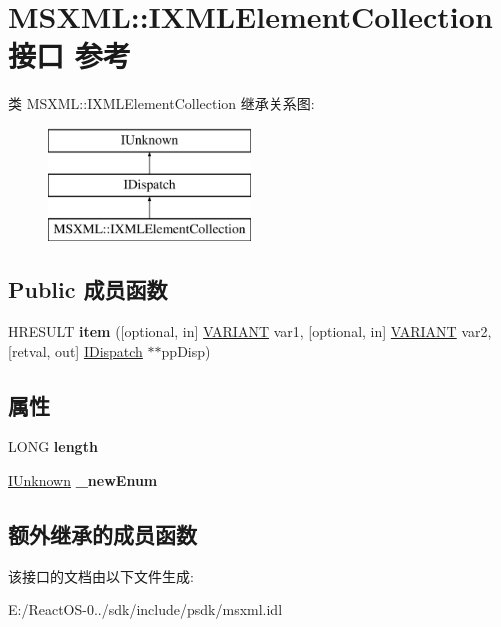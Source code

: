 \hypertarget{interface_m_s_x_m_l_1_1_i_x_m_l_element_collection}{}\section{M\+S\+X\+ML\+:\+:I\+X\+M\+L\+Element\+Collection接口 参考}
\label{interface_m_s_x_m_l_1_1_i_x_m_l_element_collection}
类 M\+S\+X\+ML\+:\+:I\+X\+M\+L\+Element\+Collection 继承关系图\+:\begin{figure}[H]
\begin{center}
\leavevmode
\includegraphics[height=3.000000cm]{interface_m_s_x_m_l_1_1_i_x_m_l_element_collection}
\end{center}
\end{figure}
\subsection*{Public 成员函数}
\begin{DoxyCompactItemize}
\item 
\mbox{\label{interface_m_s_x_m_l_1_1_i_x_m_l_element_collection_af32226036e45266a887ecb533ab21281}} 
H\+R\+E\+S\+U\+LT {\bfseries item} (\mbox{[}optional, in\mbox{]} \hyperlink{structtag_v_a_r_i_a_n_t}{V\+A\+R\+I\+A\+NT} var1, \mbox{[}optional, in\mbox{]} \hyperlink{structtag_v_a_r_i_a_n_t}{V\+A\+R\+I\+A\+NT} var2, \mbox{[}retval, out\mbox{]} \hyperlink{interface_i_dispatch}{I\+Dispatch} $\ast$$\ast$pp\+Disp)
\end{DoxyCompactItemize}
\subsection*{属性}
\begin{DoxyCompactItemize}
\item 
\mbox{\label{interface_m_s_x_m_l_1_1_i_x_m_l_element_collection_afee930cdb7c5a8a59762de90bc88da29}} 
L\+O\+NG {\bfseries length}
\item 
\mbox{\label{interface_m_s_x_m_l_1_1_i_x_m_l_element_collection_a7c5fa0c856f5c61c9a6031259a5f0d3b}} 
\hyperlink{interface_i_unknown}{I\+Unknown} {\bfseries \+\_\+new\+Enum}
\end{DoxyCompactItemize}
\subsection*{额外继承的成员函数}


该接口的文档由以下文件生成\+:\begin{DoxyCompactItemize}
\item 
E\+:/\+React\+O\+S-\/0../sdk/include/psdk/msxml.\+idl\end{DoxyCompactItemize}
